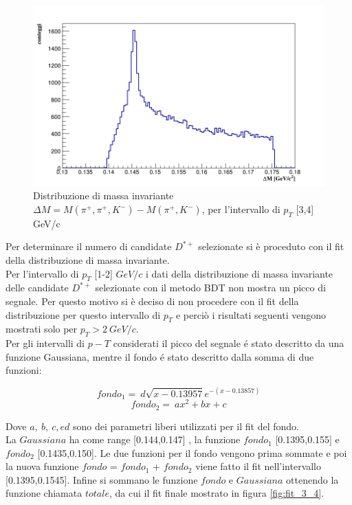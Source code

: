  \begin{figure}[htbp] 
        \centering
        \includegraphics[width=0.7\linewidth]{AnalisiDati/diffDstarD0_3_4BDT.png}
        \caption{Distribuzione di massa invariante $\Delta M = M(\pi^+,\pi^+,K^-) - M(\pi^+,K^-)$, per l'intervallo di $p_T$ [3,4] GeV/c}
        \label{fig:diffDstarD0_3_4_BDT}
    \end{figure}
    
Per determinare il numero di candidate $D^{*+}$ selezionate si è proceduto con il fit della distribuzione di massa invariante. 
\\Per l'intervallo di $p_T$ [1-2] $GeV/c$ i dati della distribuzione di massa invariante delle candidate $D^{*+}$ selezionate con il metodo BDT non mostra un picco di segnale. Per questo motivo si è deciso di non procedere con il fit della distribuzione per questo intervallo di $p_T$ e perciò i risultati seguenti vengono mostrati solo per $p_T > 2 \ GeV/c$.
\\Per gli intervalli di $p-T$ considerati il picco del segnale é stato descritto da una funzione Gaussiana, mentre il fondo é stato descritto dalla somma di due funzioni:

    \begin{equation}
        fondo_1  = \ d \sqrt{x-0.13957} e^{- (x - 0.13857) }
    \end{equation}
     \begin{equation}
        fondo_2 = \ a x^2 + b x + c
    \end{equation}
    
Dove $a, \ b, \ c, e d$ sono dei parametri liberi utilizzati per il fit del fondo.
\\La $Gaussiana$ ha come range [0.144,0.147] , la funzione $fondo_1$ [0.1395,0.155] e $fondo_2$  [0.1435,0.150]. Le due funzioni per il fondo vengono prima sommate e poi la nuova funzione $fondo$ = $fondo_1$ + $fondo_2$ viene fatto il fit nell'intervallo [0.1395,0.1545]. Infine si sommano le funzione $fondo$ e $Gaussiana$ ottenendo la funzione chiamata $totale$, da cui il fit finale mostrato in figura \ref{fig:fit_3_4}.

